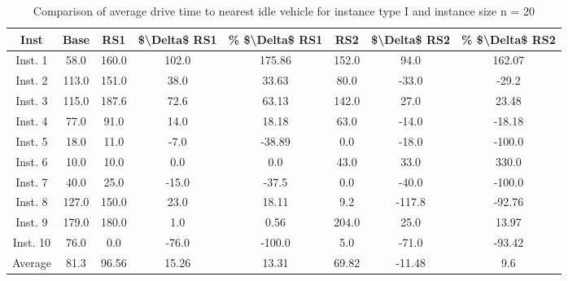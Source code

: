 \begin{table}[H]
\centering
\begin{tabular}{cccccccc}
  \hline
  \textbf{Inst} & \textbf{Base} & \textbf{RS1} & \textbf{\$\textbackslash{}Delta\$  RS1} & \textbf{\% \$\textbackslash{}Delta\$  RS1} & \textbf{RS2} & \textbf{\$\textbackslash{}Delta\$  RS2} & \textbf{\% \$\textbackslash{}Delta\$  RS2} \\\hline
  Inst. 1 & 58.0 & 160.0 & 102.0 & 175.86 & 152.0 & 94.0 & 162.07 \\
  Inst. 2 & 113.0 & 151.0 & 38.0 & 33.63 & 80.0 & -33.0 & -29.2 \\
  Inst. 3 & 115.0 & 187.6 & 72.6 & 63.13 & 142.0 & 27.0 & 23.48 \\
  Inst. 4 & 77.0 & 91.0 & 14.0 & 18.18 & 63.0 & -14.0 & -18.18 \\
  Inst. 5 & 18.0 & 11.0 & -7.0 & -38.89 & 0.0 & -18.0 & -100.0 \\
  Inst. 6 & 10.0 & 10.0 & 0.0 & 0.0 & 43.0 & 33.0 & 330.0 \\
  Inst. 7 & 40.0 & 25.0 & -15.0 & -37.5 & 0.0 & -40.0 & -100.0 \\
  Inst. 8 & 127.0 & 150.0 & 23.0 & 18.11 & 9.2 & -117.8 & -92.76 \\
  Inst. 9 & 179.0 & 180.0 & 1.0 & 0.56 & 204.0 & 25.0 & 13.97 \\
  Inst. 10 & 76.0 & 0.0 & -76.0 & -100.0 & 5.0 & -71.0 & -93.42 \\
  Average & 81.3 & 96.56 & 15.26 & 13.31 & 69.82 & -11.48 & 9.6 \\\hline
\end{tabular}
\caption{Comparison of average drive time to nearest idle vehicle for instance type I and instance size n = 20}
\label{tab:wait:resrelocation-nearest-drive-time-comparison_I_20}
\end{table}
